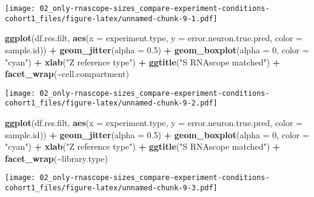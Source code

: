 \documentclass[
]{article}
\newenvironment{Shaded}{\begin{snugshade}}{\end{snugshade}}
\newcommand{\AttributeTok}[1]{\textcolor[rgb]{0.13,0.29,0.53}{#1}}
\newcommand{\DecValTok}[1]{\textcolor[rgb]{0.00,0.00,0.81}{#1}}
\newcommand{\FloatTok}[1]{\textcolor[rgb]{0.00,0.00,0.81}{#1}}
\newcommand{\FunctionTok}[1]{\textcolor[rgb]{0.13,0.29,0.53}{\textbf{#1}}}
\newcommand{\NormalTok}[1]{#1}
\newcommand{\SpecialCharTok}[1]{\textcolor[rgb]{0.81,0.36,0.00}{\textbf{#1}}}
\newcommand{\StringTok}[1]{\textcolor[rgb]{0.31,0.60,0.02}{#1}}
\begin{document}
\texttt{[image: 02\_only-rnascope-sizes\_compare-experiment-conditions-cohort1\_files/figure-latex/unnamed-chunk-9-1.pdf]}

\begin{Shaded}
\begin{Highlighting}[]
\FunctionTok{ggplot}\NormalTok{(df.res.filt, }\FunctionTok{aes}\NormalTok{(}\AttributeTok{x =}\NormalTok{ experiment.type, }
                        \AttributeTok{y =}\NormalTok{ error.neuron.true.pred, }\AttributeTok{color =}\NormalTok{ sample.id)) }\SpecialCharTok{+} \FunctionTok{geom\_jitter}\NormalTok{(}\AttributeTok{alpha =} \FloatTok{0.5}\NormalTok{) }\SpecialCharTok{+} 
  \FunctionTok{geom\_boxplot}\NormalTok{(}\AttributeTok{alpha =} \DecValTok{0}\NormalTok{, }\AttributeTok{color =} \StringTok{"cyan"}\NormalTok{) }\SpecialCharTok{+} \FunctionTok{xlab}\NormalTok{(}\StringTok{"Z reference type"}\NormalTok{) }\SpecialCharTok{+}
  \FunctionTok{ggtitle}\NormalTok{(}\StringTok{"S RNAscope matched"}\NormalTok{) }\SpecialCharTok{+} \FunctionTok{facet\_wrap}\NormalTok{(}\SpecialCharTok{\textasciitilde{}}\NormalTok{cell.compartment)}
\end{Highlighting}
\end{Shaded}

\texttt{[image: 02\_only-rnascope-sizes\_compare-experiment-conditions-cohort1\_files/figure-latex/unnamed-chunk-9-2.pdf]}

\begin{Shaded}
\begin{Highlighting}[]
\FunctionTok{ggplot}\NormalTok{(df.res.filt, }\FunctionTok{aes}\NormalTok{(}\AttributeTok{x =}\NormalTok{ experiment.type, }
                        \AttributeTok{y =}\NormalTok{ error.neuron.true.pred, }\AttributeTok{color =}\NormalTok{ sample.id)) }\SpecialCharTok{+} \FunctionTok{geom\_jitter}\NormalTok{(}\AttributeTok{alpha =} \FloatTok{0.5}\NormalTok{) }\SpecialCharTok{+} 
  \FunctionTok{geom\_boxplot}\NormalTok{(}\AttributeTok{alpha =} \DecValTok{0}\NormalTok{, }\AttributeTok{color =} \StringTok{"cyan"}\NormalTok{) }\SpecialCharTok{+} \FunctionTok{xlab}\NormalTok{(}\StringTok{"Z reference type"}\NormalTok{) }\SpecialCharTok{+}
  \FunctionTok{ggtitle}\NormalTok{(}\StringTok{"S RNAscope matched"}\NormalTok{) }\SpecialCharTok{+} \FunctionTok{facet\_wrap}\NormalTok{(}\SpecialCharTok{\textasciitilde{}}\NormalTok{library.type)}
\end{Highlighting}
\end{Shaded}

\texttt{[image: 02\_only-rnascope-sizes\_compare-experiment-conditions-cohort1\_files/figure-latex/unnamed-chunk-9-3.pdf]}
\end{document}
